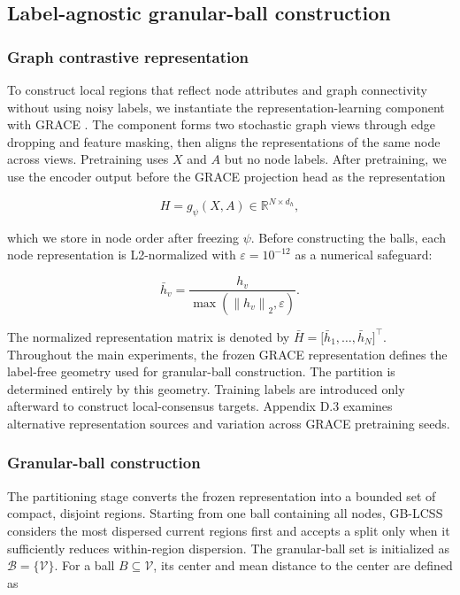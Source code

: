 \documentclass[preprint,12pt]{elsarticle}
\begin{document}
\subsection{Label-agnostic granular-ball construction}\label{sec:3.3}

\subsubsection{Graph contrastive representation}\label{sec:3.3.1}

To construct local regions that reflect node attributes and graph connectivity without using noisy labels, we instantiate the representation-learning component with GRACE \cite{ref16}. The component forms two stochastic graph views through edge dropping and feature masking, then aligns the representations of the same node across views. Pretraining uses \(X\) and \(A\) but no node labels. After pretraining, we use the encoder output before the GRACE projection head as the representation

\begin{equation}\label{eq:2}
H = g_{\psi}(X,A) \in \mathbb{R}^{N \times d_{h}},
\end{equation}

which we store in node order after freezing \(\psi\). Before constructing the balls, each node representation is L2-normalized with \(\varepsilon = 10^{- 12}\) as a numerical safeguard:

\begin{equation}\label{eq:3}
{\bar{h}}_{v} = \frac{h_{v}}{\max(\left\| h_{v} \right\|_{2},\varepsilon)}.
\end{equation}

The normalized representation matrix is denoted by \(\bar{H} = \lbrack{\bar{h}}_{1},\ldots,{\bar{h}}_{N}\rbrack^{\top}\). Throughout the main experiments, the frozen GRACE representation defines the label-free geometry used for granular-ball construction. The partition is determined entirely by this geometry. Training labels are introduced only afterward to construct local-consensus targets. Appendix D.3 examines alternative representation sources and variation across GRACE pretraining seeds.

\subsubsection{Granular-ball construction}\label{sec:3.3.2}

The partitioning stage converts the frozen representation into a bounded set of compact, disjoint regions. Starting from one ball containing all nodes, GB-LCSS considers the most dispersed current regions first and accepts a split only when it sufficiently reduces within-region dispersion. The granular-ball set is initialized as \(\mathcal{B} = \{\mathcal{V}\}\). For a ball \(B \subseteq \mathcal{V}\), its center and mean distance to the center are defined as
\end{document}
